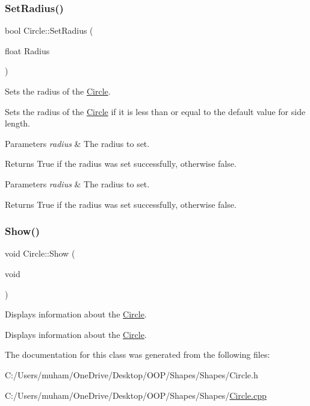 \subsubsection{\texorpdfstring{SetRadius()}{SetRadius()}}
{\footnotesize\ttfamily bool Circle\+::\+Set\+Radius (\begin{DoxyParamCaption}\item[{float}]{Radius }\end{DoxyParamCaption})}



Sets the radius of the \mbox{\hyperlink{class_circle}{Circle}}. 

Sets the radius of the \mbox{\hyperlink{class_circle}{Circle}} if it is less than or equal to the default value for side length.


\begin{DoxyParams}{Parameters}
{\em radius} & The radius to set.\\
\hline
\end{DoxyParams}
\begin{DoxyReturn}{Returns}
True if the radius was set successfully, otherwise false.
\end{DoxyReturn}



\begin{DoxyParams}{Parameters}
{\em radius} & The radius to set. \\
\hline
\end{DoxyParams}
\begin{DoxyReturn}{Returns}
True if the radius was set successfully, otherwise false. 
\end{DoxyReturn}
\mbox{\label{class_circle_a9ade44170d48efc91d3c35e8be4e4b5a}} 
\subsubsection{\texorpdfstring{Show()}{Show()}}
{\footnotesize\ttfamily void Circle\+::\+Show (\begin{DoxyParamCaption}\item[{void}]{ }\end{DoxyParamCaption})}



Displays information about the \mbox{\hyperlink{class_circle}{Circle}}. 

Displays information about the \mbox{\hyperlink{class_circle}{Circle}}.

The documentation for this class was generated from the following files\+:\begin{DoxyCompactItemize}
\item 
C\+:/\+Users/muham/\+One\+Drive/\+Desktop/\+O\+O\+P/\+Shapes/\+Shapes/Circle.\+h\item 
C\+:/\+Users/muham/\+One\+Drive/\+Desktop/\+O\+O\+P/\+Shapes/\+Shapes/\mbox{\hyperlink{_circle_8cpp}{Circle.\+cpp}}\end{DoxyCompactItemize}
